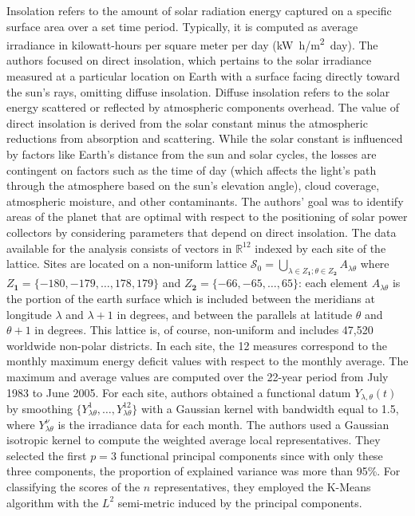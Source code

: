 Insolation refers to the amount of solar radiation energy captured on a specific surface area over a set time period. Typically, it is computed as average irradiance in kilowatt-hours per square meter per day (\unit{\kilo\watt.h/\metre^2.day}). The authors focused on direct insolation, which pertains to the solar irradiance measured at a particular location on Earth with a surface facing directly toward the sun's rays, omitting diffuse insolation. Diffuse insolation refers to the solar energy scattered or reflected by atmospheric components overhead. The value of direct insolation is derived from the solar constant minus the atmospheric reductions from absorption and scattering. While the solar constant is influenced by factors like Earth's distance from the sun and solar cycles, the losses are contingent on factors such as the time of day (which affects the light's path through the atmosphere based on the sun's elevation angle), cloud coverage, atmospheric moisture, and other contaminants. The authors' goal was to identify areas of the planet that are optimal with respect to the positioning of solar power collectors by considering parameters that depend on direct insolation. The data available for the analysis consists of vectors in $\mathbb{R}^{12}$ indexed by each site of the lattice. Sites are located on a non-uniform lattice $\mathcal{S}_0=\bigcup_{\lambda \in Z_{\mathbf{1}};\theta \in Z_{\mathbf{2}}}A_{\lambda\theta}$ where $Z_{\mathbf{1}} = \{ -180, -179, \dots, 178, 179\}$ and $Z_{\mathbf{2}} = \{ -66, -65, \dots, 65\}$: each element $A_{\lambda\theta}$ is the portion of the earth surface which is included between the meridians at longitude $\lambda$ and $\lambda + 1$ in degrees, and between the parallels at latitude $\theta$ and $\theta + 1$ in degrees. This lattice is, of course, non-uniform and includes 47,520 worldwide non-polar districts. In each site, the 12 measures correspond to the monthly maximum energy deficit values with respect to the monthly average. The maximum and average values are computed over the 22-year period from July 1983 to June 2005. For each site, authors obtained a functional datum $Y_{\lambda,\theta}(t)$ by smoothing $\{Y_{\lambda\theta}^1, \dots, Y_{\lambda\theta}^12\}$ with a Gaussian kernel with bandwidth equal to 1.5, where $Y_{\lambda\theta}^\nu$ is the irradiance data for each month. The authors used a Gaussian isotropic kernel to compute the weighted average local representatives. They selected the first $p=3$ functional principal components since with only these three components, the proportion of explained variance was more than 95\%. For classifying the scores of the $n$ representatives, they employed the K-Means algorithm with the $L^2$ semi-metric induced by the principal components.
